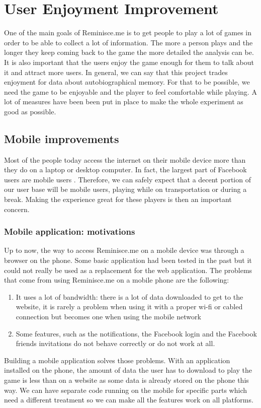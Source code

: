 \chapter{User Enjoyment Improvement}
One of the main goals of Reminisce.me is to get people to play a lot of games in order to be able to collect a lot of information. The more a person plays and the longer they keep coming back to the game the more detailed the analysis can be. It is also important that the users enjoy the game enough for them to talk about it and attract more users. In general, we can say that this project trades enjoyment for data about autobiographical memory. For that to be possible, we need the game to be enjoyable and the player to feel comfortable while playing. A lot of measures have been been put in place to make the whole experiment as good as possible.
\section{Mobile improvements}
Most of the people today access the internet on their mobile device more than they do on a laptop or desktop computer. In fact, the largest part of Facebook users are mobile users \cite{mobileusage}. Therefore, we can safely expect that a decent portion of our user base will be mobile users, playing while on transportation or during a break. Making the experience great for these players is then an important concern.
\subsection{Mobile application: motivations}
Up to now, the way to access Reminisce.me on a mobile device was through a browser on the phone. Some basic application had been tested in the past but it could not really be used as a replacement for the web application. The problems that come from using Reminisce.me on a mobile phone are the following:
\begin{enumerate}
	\item It uses a lot of bandwidth: there is a lot of data downloaded to get to the website, it is rarely a problem when using it with a proper wi-fi or cabled connection but becomes one when using the mobile network
	\item Some features, such as the notifications, the Facebook login and the Facebook friends invitations do not behave correctly or do not work at all.
\end{enumerate}
Building a mobile application solves those problems. With an application installed on the phone, the amount of data the user has to download to play the game is less than on a website as some data is already stored on the phone this way. We can have separate code running on the mobile for specific parts which need a different treatment so we can make all the features work on all platforms.
